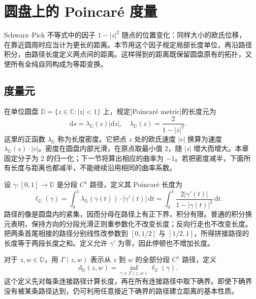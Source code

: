 \section{圆盘上的 Poincaré 度量}
\label{b3:sec:1301}

Schwarz--Pick 不等式中的因子 \(1-|z|^2\) 随点的位置变化：同样大小的欧氏位移，在靠近圆周时应当计为更长的距离。本节用这个因子规定局部长度单位，再沿路径积分，由路径长度定义两点间的距离。这样得到的距离既保留圆盘原有的拓扑，又使所有全纯自同构成为等距变换。

\subsection{度量元}
\label{b3:subsec:130101}

在单位圆盘 \(\mathbb D=\{z\in\mathbb C:|z|<1\}\) 上，规定[Poincaré metric]的长度元为
\[
 \mathrm ds=\lambda_{\mathbb D}(z)|\mathrm dz|,
 \quad
 \lambda_{\mathbb D}(z)=\frac{2}{1-|z|^2}.
\]
这里的正函数 \(\lambda_{\mathbb D}\) 称为长度密度。它把点 \(z\) 处的欧氏速度 \(|v|\) 换算为速度 \(\lambda_{\mathbb D}(z)\cdot|v|\)。密度在圆盘内部光滑，在原点取最小值 \(2\)，随 \(|z|\) 增大而增大。本章固定分子为 \(2\) 的归一化；下一节将算出相应的曲率为 \(-1\)。若把密度减半，下面所有长度与距离也都减半，不能继续沿用相同的曲率系数。

\ProseParagraphBreak
设 \(\gamma:[0,1]\to\mathbb D\) 是分段 \(C^1\) 路径，定义其 Poincaré 长度为
\[
 \ell_{\mathbb D}(\gamma)
 =\int_0^1\lambda_{\mathbb D}(\gamma(t))\cdot|\gamma'(t)|\,\mathrm dt
 =\int_0^1\frac{2|\gamma'(t)|}{1-|\gamma(t)|^2}\,\mathrm dt.
\]
路径的像是圆盘内的紧集，因而分母在路径上有正下界，积分有限。普通的积分换元表明，保持方向的分段光滑正则重参数化不改变长度；反向行走也不改变长度。把两条首尾相接的路径分别线性改参数到 \([0,1/2]\) 与 \([1/2,1]\)，所得拼接路径的长度等于两段长度之和。定义允许 \(\gamma'\) 为零，因此停顿也不增加长度。

\ProseParagraphBreak
对于 \(z,w\in\mathbb D\)，用 \(\Gamma(z,w)\) 表示从 \(z\) 到 \(w\) 的全部分段 \(C^1\) 路径，定义
\[
 \mathrm d_{\mathbb D}(z,w)
 =\inf_{\gamma\in\Gamma(z,w)}\ell_{\mathbb D}(\gamma).
\]
这个定义先对每条连接路径计算长度，再在所有连接路径中取下确界。即使下确界没有被某条路径达到，仍可利用任意接近下确界的路径建立距离的基本性质。

